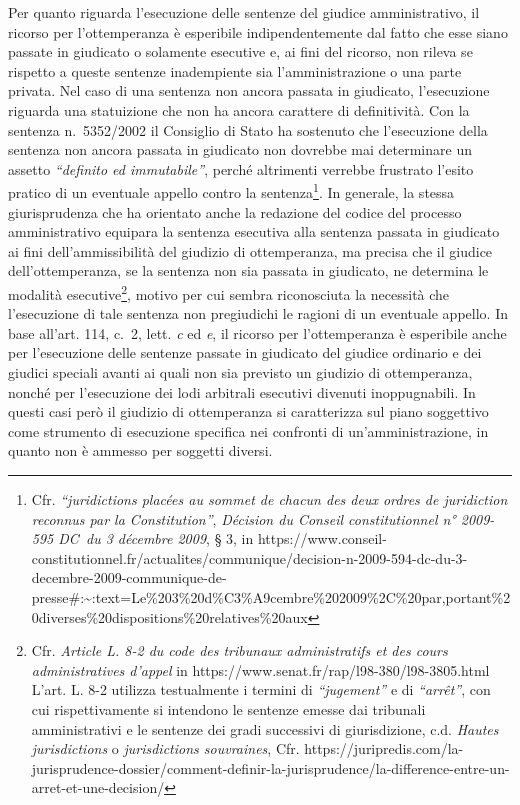 \documentclass[12pt,it,a4paper,]{report}
\begin{document}
Per quanto riguarda l'esecuzione delle sentenze del giudice
amministrativo, il ricorso per l'ottemperanza è esperibile
indipendentemente dal fatto che esse siano passate in giudicato o
solamente esecutive e, ai fini del ricorso, non rileva se rispetto a
queste sentenze inadempiente sia l'amministrazione o una parte privata.
Nel caso di una sentenza non ancora passata in giudicato, l'esecuzione
riguarda una statuizione che non ha ancora carattere di definitività.
Con la sentenza n.~5352/2002 il Consiglio di Stato ha sostenuto che
l'esecuzione della sentenza non ancora passata in giudicato non dovrebbe
mai determinare un assetto \emph{``definito ed immutabile''}, perché
altrimenti verrebbe frustrato l'esito pratico di un eventuale appello
contro la sentenza\footnote{Cfr. \emph{``juridictions placées au sommet
  de chacun des deux ordres de juridiction reconnus par la
  Constitution''}, \emph{Décision du Conseil constitutionnel n° 2009-595
  DC~du 3 décembre 2009}, § 3, in
  https://www.conseil-constitutionnel.fr/actualites/communique/decision-n-2009-594-dc-du-3-decembre-2009-communique-de-presse\#:\textasciitilde:text=Le\%203\%20d\%C3\%A9cembre\%202009\%2C\%20par,portant\%20diverses\%20dispositions\%20relatives\%20aux}.
In generale, la stessa giurisprudenza che ha orientato anche la
redazione del codice del processo amministrativo equipara la sentenza
esecutiva alla sentenza passata in giudicato ai fini dell'ammissibilità
del giudizio di ottemperanza, ma precisa che il giudice
dell'ottemperanza, se la sentenza non sia passata in giudicato, ne
determina le modalità esecutive\footnote{Cfr. \emph{Article L. 8-2 du
  code des tribunaux administratifs et des cours administratives
  d'appel} in https://www.senat.fr/rap/l98-380/l98-3805.html L'art. L.
  8-2 utilizza testualmente i termini di \emph{``jugement''} e di
  \emph{``arrêt''}, con cui rispettivamente si intendono le sentenze
  emesse dai tribunali amministrativi e le sentenze dei gradi successivi
  di giurisdizione, c.d. \emph{Hautes jurisdictions} o
  \emph{jurisdictions souvraines}, Cfr.
  https://juripredis.com/la-jurisprudence-dossier/comment-definir-la-jurisprudence/la-difference-entre-un-arret-et-une-decision/},
motivo per cui sembra riconosciuta la necessità che l'esecuzione di tale
sentenza non pregiudichi le ragioni di un eventuale appello. In base
all'art. 114, c.~2, lett. \emph{c} ed \emph{e}, il ricorso per
l'ottemperanza è esperibile anche per l'esecuzione delle sentenze
passate in giudicato del giudice ordinario e dei giudici speciali avanti
ai quali non sia previsto un giudizio di ottemperanza, nonché per
l'esecuzione dei lodi arbitrali esecutivi divenuti inoppugnabili. In
questi casi però il giudizio di ottemperanza si caratterizza sul piano
soggettivo come strumento di esecuzione specifica nei confronti di
un'amministrazione, in quanto non è ammesso per soggetti diversi.
\end{document}

